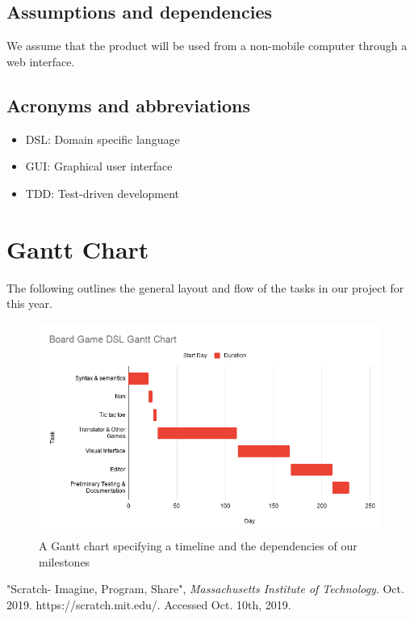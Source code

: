 \documentclass[10pt,letter,draftclsnofoot,onecolumn]{IEEEtran}
\begin{document}
\begin{singlespace}
    \subsection{Assumptions and dependencies}
        We assume that the product will be used from a non-mobile computer through a web interface.
    \subsection{Acronyms and abbreviations}
        \begin{itemize}
            \item DSL: Domain specific language
            \item GUI: Graphical user interface 
            \item TDD: Test-driven development 
        \end{itemize}{}


\newpage
\section{Gantt Chart}


The following outlines the general layout and flow of the tasks in our project for this year.

\begin{figure}[H]
  \centering
  \captionsetup{justification=centering}
    \includegraphics[width=1.0\textwidth,keepaspectratio]{./img/gantt}
    \caption{A Gantt chart specifying a timeline and the dependencies of our milestones}
\end{figure}

%

\begin{thebibliography}{99}
 "Scratch- Imagine, Program, Share", \emph{Massachusetts Institute of Technology}. Oct. 2019. https://scratch.mit.edu/. Accessed Oct. 10th, 2019.
\end{thebibliography}

\end{singlespace}
\end{document}
